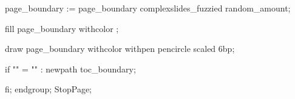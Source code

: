   page_boundary := page_boundary complexslides_fuzzied random_amount;

  fill page_boundary withcolor ;

  draw page_boundary withcolor  
       withpen pencircle scaled 6bp;

  if "\currentmakeup" = "" :
     newpath toc_boundary;


  fi;
  endgroup;
  StopPage;
\stopuseMPgraphic


\setupbackgrounds[\v!page][\c!background={complexslides:pagebackground}]


\protect

\stopmodule
